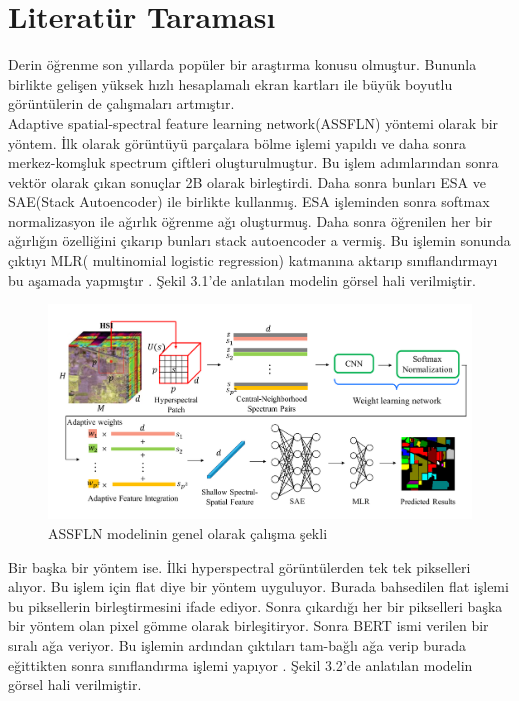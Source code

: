 \chapter{Literatür Taraması}

Derin öğrenme son yıllarda popüler bir araştırma konusu olmuştur. Bununla birlikte gelişen yüksek 
hızlı hesaplamalı ekran kartları ile büyük boyutlu görüntülerin de çalışmaları artmıştır.\\

Adaptive spatial-spectral feature learning network(ASSFLN) yöntemi olarak bir yöntem. İlk olarak görüntüyü parçalara bölme işlemi yapıldı ve daha sonra merkez-komşluk spectrum çiftleri oluşturulmuştur. Bu işlem adımlarından sonra vektör olarak çıkan sonuçlar 2B olarak birleştirdi. Daha sonra bunları ESA ve SAE(Stack Autoencoder) ile birlikte kullanmış. ESA işleminden sonra softmax normalizasyon ile ağırlık öğrenme ağı oluşturmuş. Daha sonra öğrenilen her bir ağırlığın özelliğini çıkarıp bunları  stack autoencoder a vermiş. Bu işlemin sonunda çıktıyı MLR( multinomial logistic regression) katmanına aktarıp sınıflandırmayı bu aşamada yapmıştır \cite{li2019adaptive}. Şekil 3.1'de anlatılan modelin görsel hali verilmiştir. \\

\begin{figure}[!ht]
  \centering
  \includegraphics[width=1\textwidth]{Figures/assfln13.png}
  \caption{ASSFLN modelinin genel olarak çalışma şekli }
\end{figure}

\newpage
Bir başka bir yöntem ise. İlki hyperspectral görüntülerden tek tek pikselleri alıyor. Bu işlem için flat diye bir yöntem uyguluyor. Burada bahsedilen flat işlemi bu piksellerin birleştirmesini ifade ediyor. Sonra çıkardığı her bir pikselleri  başka bir yöntem olan pixel gömme olarak birleşitiryor.  Sonra BERT ismi verilen bir sıralı ağa veriyor. Bu işlemin ardından çıktıları tam-bağlı ağa verip burada eğittikten sonra sınıflandırma işlemi yapıyor \cite{he2019hsi}. Şekil 3.2'de anlatılan modelin görsel hali verilmiştir. \\

